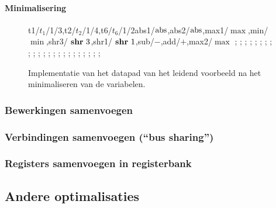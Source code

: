 \paragraph{Minimalisering}
\begin{figure}[hbt]
\centering
\begin{sprocessor}[2.75/4.6/1.3/1.4/0.25/0.8]{t1/{$t_1$}/1/3,t2/{$t_2$}/1/4,t6/{$t_6$}/1/2}{abs1/$\operatorname{abs}$,abs2/$\operatorname{abs}$,max1/$\max$,min/$\min$,shr3/$\mbox{ \textbf{shr} }3$,shr1/$\mbox{ \textbf{shr} }1$,sub/$-$,add/$+$,max2/$\max$}{}
;
;
;
;
;
;
;
;
;
;
;
;
;
;
;
;
;
;
;
;
;
;
;
\end{sprocessor}
\caption{Implementatie van het datapad van het leidend voorbeeld na het minimaliseren van de variabelen.}
\end{figure}
\subsubsection{Bewerkingen samenvoegen}
\subsubsection{Verbindingen samenvoegen (``bus sharing'')}
\subsubsection{Registers samenvoegen in registerbank}
\subsection{Andere optimalisaties}
\label{ss:syntheseFSMDOptimal}
